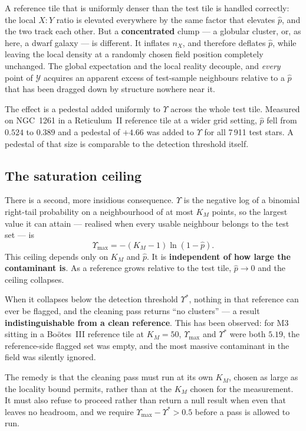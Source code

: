 \documentclass[11pt,a4paper]{article}
\newcommand{\Ycal}{\mathcal{Y}}              %
\newcommand{\Ups}{\Upsilon}                  %
\newcommand{\phat}{\hat{p}}                  %
\newcommand{\Ups}{\Upsilon}
\newcommand{\phat}{\hat{p}}
\newcommand{\Ycal}{\mathcal{Y}}
\begin{document}
A reference tile that is uniformly denser than the test tile is handled correctly: the local
$X\!:\!Y$ ratio is elevated everywhere by the same factor that elevates $\phat$, and the two track
each other. But a \textbf{concentrated} clump --- a globular cluster, or, as here, a dwarf galaxy
--- is different. It inflates $n_X$, and therefore deflates $\phat$, while leaving the local
density at a randomly chosen field position completely unchanged. The global expectation and the
local reality decouple, and \emph{every} point of $\Ycal$ acquires an apparent excess of
test-sample neighbours relative to a $\phat$ that has been dragged down by structure nowhere near
it.

The effect is a pedestal added uniformly to $\Ups$ across the whole test tile. Measured on NGC~1261
in a Reticulum~II reference tile at a wider grid setting, $\phat$ fell from $0.524$ to $0.389$ and
a pedestal of $+4.66$ was added to $\Ups$ for all 7\,911 test stars. A pedestal of that size is
comparable to the detection threshold itself.

\subsection{The saturation ceiling}
\label{sec:ceiling}

There is a second, more insidious consequence. $\Ups$ is the negative log of a binomial right-tail
probability on a neighbourhood of at most $K_M$ points, so the largest value it can attain ---
realised when every usable neighbour belongs to the test set --- is
%
\begin{equation}
\Ups_{\max} = -(K_M - 1)\ln(1 - \phat).
\label{eq:ceiling}
\end{equation}
%
This ceiling depends only on $K_M$ and $\phat$. It is \textbf{independent of how large the
contaminant is}. As a reference grows relative to the test tile, $\phat \to 0$ and the ceiling
collapses.

When it collapses below the detection threshold $\Ups^*$, nothing in that reference can ever be
flagged, and the cleaning pass returns ``no clusters'' --- a result \textbf{indistinguishable from
a clean reference}. This has been observed: for M3 sitting in a Bo\"otes~III reference tile at
$K_M = 50$, $\Ups_{\max}$ and $\Ups^*$ were both $5.19$, the reference-side flagged set was empty,
and the most massive contaminant in the field was silently ignored.

The remedy is that the cleaning pass must run at its own $K_M$, chosen as large as the locality
bound permits, rather than at the $K_M$ chosen for the measurement. It must also refuse to proceed
rather than return a null result when even that leaves no headroom, and we require
$\Ups_{\max} - \Ups^* > 0.5$ before a pass is allowed to run.
\end{document}
